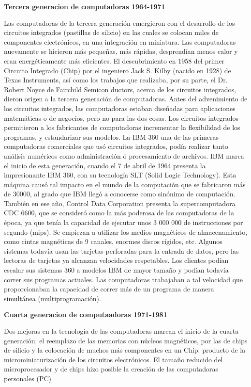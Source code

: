 \documentclass[10pt,a4paper]{article}
\begin{document}
\begin{multicols}{2}
\begin{center}
\textbf{Tercera generacion de computadoras 1964-1971}
\end{center}
Las computadoras de la tercera generación emergieron con el desarrollo de los circuitos integrados (pastillas de silicio) en las cuales se colocan miles de componentes electrónicos, en una integración en miniatura. Las computadoras nuevamente se hicieron más pequeñas, más rápidas, desprendían menos calor y eran energéticamente más eficientes.
El descubrimiento en 1958 del primer Circuito Integrado (Chip) por el ingeniero Jack S. Kilby (nacido en 1928) de Texas Instruments, así como los trabajos que realizaba, por su parte, el Dr. Robert Noyce de Fairchild Semicon ductors, acerca de los circuitos integrados, dieron origen a la tercera generación de computadoras.
Antes del advenimiento de los circuitos integrados, las computadoras estaban diseñadas para aplicaciones matemáticas o de negocios, pero no para las dos cosas. Los circuitos integrados permitieron a los fabricantes de computadoras incrementar la flexibilidad de los programas, y estandarizar sus modelos.
La IBM 360 una de las primeras computadoras comerciales que usó circuitos integrados, podía realizar tanto análisis numéricos como administración ó procesamiento de archivos.
IBM marca el inicio de esta generación, cuando el 7 de abril de 1964 presenta la impresionante IBM 360, con su tecnología SLT (Solid Logic Technology). Esta máquina causó tal impacto en el mundo de la computación que se fabricaron más de
30000, al grado que IBM llegó a conocerse como sinónimo de computación.
También en ese año, Control Data Corporation presenta la supercomputadora CDC 6600, que se consideró como la más poderosa de las computadoras de la época, ya que tenía la capacidad de ejecutar unos 3 000 000 de instrucciones por segundo (mips).
Se empiezan a utilizar los medios magnéticos de almacenamiento, como cintas magnéticas de 9 canales, enormes discos rígidos, etc. Algunos sistemas todavía usan las tarjetas perforadas para la entrada de datos, pero las lectoras de tarjetas ya alcanzan velocidades respetables.
Los clientes podían escalar sus sistemas 360 a modelos IBM de mayor tamaño y podían todavía correr sus programas actuales. Las computadoras trabajaban a tal velocidad que proporcionaban la capacidad de correr más de un programa de manera simultánea (multiprogramación).
\begin{center}
\textbf{Cuarta generacion de computaadoras 1971-1981}
\end{center}
Dos mejoras en la tecnología de las computadoras marcan el inicio de la cuarta generación: el reemplazo de las memorias con núcleos magnéticos, por las de chips de silicio y la colocación de muchos más componentes en un Chip: producto de la microminiaturización de los circuitos electrónicos. El tamaño reducido del microprocesador y de chips hizo posible la creación de las computadoras personales (PC)

\end{multicols}
\end{document}
